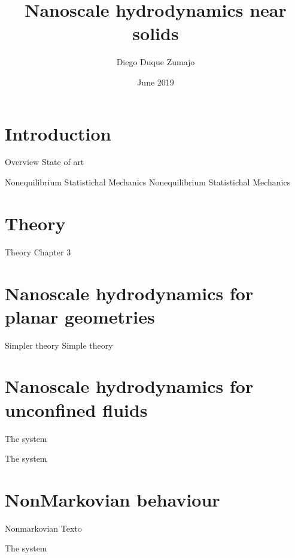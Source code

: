 \documentclass{beamer}
\title{Nanoscale hydrodynamics near solids}
\date{June 2019}
\author{Diego Duque Zumajo}
\institute{Departamento Física Fundamental \\Universidad Nacional de Educación a Distancia}
\begin{document}
\maketitle



\section{Introduction}
\begin{frame}{Overview}
  State of art
\end{frame}

\begin{frame}{Nonequilibrium Statistichal Mechanics}
  Nonequilibrium Statistichal Mechanics
\end{frame}

\section{Theory}
\begin{frame}{Theory}
Chapter 3
\end{frame}

\section{Nanoscale hydrodynamics for planar geometries}
\begin{frame}{Simpler theory}
  Simple theory
\end{frame}

\section{Nanoscale hydrodynamics for unconfined fluids}
\begin{frame}{The system}
\end{frame}
\begin{frame}{The system}
\end{frame}

\section{NonMarkovian behaviour}
\begin{frame}{Nonmarkovian}
Texto
\end{frame}
\begin{frame}{The system}
\end{frame}
\end{document}
